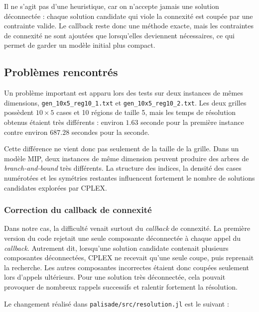 Il ne s'agit pas d'une heuristique, car on n'accepte jamais une solution déconnectée : chaque solution candidate qui viole la connexité est coupée par une contrainte valide. Le callback reste donc une méthode exacte, mais les contraintes de connexité ne sont ajoutées que lorsqu'elles deviennent nécessaires, ce qui permet de garder un modèle initial plus compact.







\subsection{Problèmes rencontrés}

Un problème important est apparu lors des tests sur deux instances de mêmes
dimensions, \texttt{gen\_10x5\_reg10\_1.txt} et
\texttt{gen\_10x5\_reg10\_2.txt}. Les deux grilles possèdent \(10 \times 5\)
cases et 10 régions de taille 5, mais les temps de résolution obtenus étaient
très différents : environ \(1.63\) seconde pour la première instance contre
environ \(687.28\) secondes pour la seconde.

Cette différence ne vient donc pas seulement de la taille de la grille. Dans un
modèle MIP, deux instances de même dimension peuvent produire des arbres de
\textit{branch-and-bound} très différents. La structure des indices, la densité
des cases numérotées et les symétries restantes influencent fortement le nombre
de solutions candidates explorées par CPLEX.

\subsubsection{Correction du callback de connexité}

Dans notre cas, la difficulté venait surtout du \textit{callback} de connexité.
La première version du code rejetait une seule composante déconnectée à chaque
appel du \textit{callback}. Autrement dit, lorsqu'une solution candidate
contenait plusieurs composantes déconnectées, CPLEX ne recevait qu'une seule
coupe, puis reprenait la recherche. Les autres composantes incorrectes étaient
donc coupées seulement lors d'appels ultérieurs. Pour une solution très
déconnectée, cela pouvait provoquer de nombreux rappels successifs et ralentir
fortement la résolution.

Le changement réalisé dans \texttt{palisade/src/resolution.jl} est le suivant :

